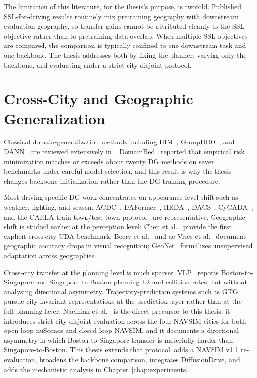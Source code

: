 The limitation of this literature, for the thesis's purpose, is twofold. Published SSL-for-driving results routinely mix pretraining geography with downstream evaluation geography, so transfer gains cannot be attributed cleanly to the SSL objective rather than to pretraining-data overlap. When multiple SSL objectives are compared, the comparison is typically confined to one downstream task and one backbone. The thesis addresses both by fixing the planner, varying only the backbone, and evaluating under a strict city-disjoint protocol.

\section{Cross-City and Geographic Generalization}
\label{sec:rw-dg}

Classical domain-generalization methods including IRM~\cite{arjovsky-irm-2019}, GroupDRO~\cite{sagawa-groupdro-2020}, and DANN~\cite{ganin-dann-2015} are reviewed extensively in~\cite{wang-domain-gen-survey-2022,zhou-domain-gen-survey-2023}. DomainBed~\cite{gulrajani-domainbed-2021} reported that empirical risk minimization matches or exceeds about twenty DG methods on seven benchmarks under careful model selection, and this result is why the thesis changes backbone initialization rather than the DG training procedure.

Most driving-specific DG work concentrates on appearance-level shift such as weather, lighting, and season. ACDC~\cite{sakaridis-acdc-2021}, DAFormer~\cite{hoyer-daformer-2022}, HRDA~\cite{hoyer-hrda-2022}, DACS~\cite{tranheden-dacs-2021}, CyCADA~\cite{pan-cycada-2018}, and the CARLA train-town/test-town protocol~\cite{dosovitskiy-carla-2017} are representative. Geographic shift is studied earlier at the perception level: Chen et al.~\cite{chen-crosscity-2017} provide the first explicit cross-city UDA benchmark; Beery et al.~\cite{beery-cameratrap-2018} and de Vries et al.~\cite{devries-geobias-2019} document geographic accuracy drops in visual recognition; GeoNet~\cite{kalluri-geonet-2023} formalizes unsupervised adaptation across geographies.

Cross-city transfer at the planning level is much sparser. VLP~\cite{pan-vlp-2024} reports Boston-to-Singapore and Singapore-to-Boston planning L2 and collision rates, but without analysing directional asymmetry. Trajectory-prediction systems such as GTG~\cite{gtg-2025} pursue city-invariant representations at the prediction layer rather than at the full planning layer. Naeinian et al.~\cite{naeinian-cross-city-2026} is the direct precursor to this thesis: it introduces strict city-disjoint evaluation across the four NAVSIM cities for both open-loop nuScenes and closed-loop NAVSIM, and it documents a directional asymmetry in which Boston-to-Singapore transfer is materially harder than Singapore-to-Boston. This thesis extends that protocol, adds a NAVSIM v1.1 re-evaluation, broadens the backbone comparison, integrates DiffusionDrive, and adds the mechanistic analysis in Chapter~\ref{chap:experiments}.

